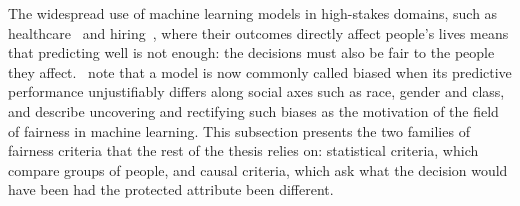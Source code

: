 The widespread use of machine learning models in high-stakes domains, such as
healthcare~\cite{shailaja2018machine} and hiring~\cite{raghavan2020mitigating}, where their outcomes
directly affect people's lives means that predicting well is not enough: the
decisions must also be fair to the people they affect.~\citet{mitchell2021algorithmic} note that a
model is now commonly called biased when its predictive performance unjustifiably differs 
along social axes such as race, gender and class, and describe
uncovering and rectifying such biases as the motivation of the field of fairness in machine
learning. This subsection presents the two families of fairness criteria that the rest of the
thesis relies on: statistical criteria, which compare groups of people, and causal criteria, which
ask what the decision would have been had the protected attribute been different.

